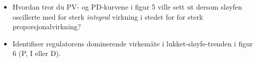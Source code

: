 \begin{itemize}
\item{} Hvordan tror du PV- og PD-kurvene i figur 5 ville sett ut dersom sløyfen oscillerte med for sterk \textit{integral} virkning i stedet for for sterk proporsjonalvirkning?
\item{} Identifiser regulatorens dominerende virkemåte i lukket-sløyfe-trenden i figur 6 (P, I eller D).
\end{itemize}




